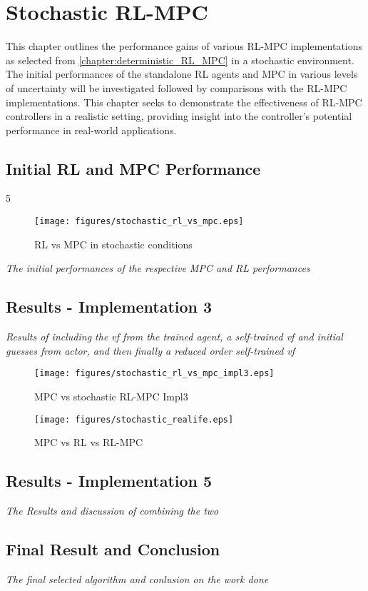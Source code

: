 \chapter{Stochastic RL-MPC}
\label{chapter:stochastic_RL_MPC}

This chapter outlines the performance gains of various RL-MPC implementations as selected from \autoref{chapter:deterministic_RL_MPC} in a stochastic environment. The initial performances of the standalone RL agents and MPC in various levels of uncertainty will be investigated followed by comparisons with the RL-MPC implementations. This chapter seeks to demonstrate the effectiveness of RL-MPC controllers in a realistic setting, providing insight into the controller's potential performance in real-world applications.

\section{Initial RL and MPC Performance}5

\begin{figure}[H]
	\centering
	\texttt{[image: figures/stochastic\_rl\_vs\_mpc.eps]}
	\caption{RL vs MPC in stochastic conditions}
	\label{fig:stochastic-rl-vs-mpc}
\end{figure}

\emph{The initial performances of the respective MPC and RL performances}

\section{Results - Implementation 3}
\emph{Results of including the vf from the trained agent, a self-trained vf and initial guesses from actor, and then finally a reduced order self-trained vf}

\begin{figure}[H]
	\centering
	\texttt{[image: figures/stochastic\_rl\_vs\_mpc\_impl3.eps]}
	\caption{MPC vs stochastic RL-MPC Impl3}
	\label{fig:stochastic-rlmpc-impl3}
\end{figure}

\begin{figure}[H]
	\centering
	\texttt{[image: figures/stochastic\_realife.eps]}
	\caption{MPC vs RL vs RL-MPC}
	\label{fig:stochastic-reallife}
\end{figure}


\section{Results - Implementation 5}
\emph{The Results and discussion of combining the two}


\section{Final Result and Conclusion}
\emph{The final selected algorithm and conlusion on the work done}